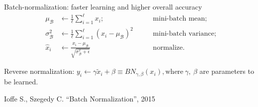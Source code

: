 \documentclass[xcolor=table]{beamer}
\begin{document}
\begin{frame}{Batch-normalization: faster learning and higher overall accuracy}
	\vspace{-0.7cm}
	\begin{align*}
		\mu_{\mathcal{B}} &\leftarrow \frac{1}{\ell} \sum_{i = 1}^\ell x_i; &\qquad \text{mini-batch mean};\\
		\sigma^2_{\mathcal{B}} &\leftarrow \frac{1}{\ell} \sum_{i = 1}^\ell (x_i - \mu_{\mathcal{B}})^2&\qquad \text{mini-batch variance};\\
		\hat{x}_i &\leftarrow \frac{x_i - \mu_{\mathcal{B}}}{\sqrt{\sigma^2_{\mathcal{B}} + \epsilon}} &\qquad \text{normalize}.
	\end{align*}

	\vspace{-0.1cm}
	Reverse normalization: $y_i \leftarrow \gamma \tilde{x}_i + \beta \equiv BN_{\gamma, \beta}(x_i), \text{where} \ \gamma,\ \beta$ are parameters to be learned. 



 	\vspace{-0.1cm}
	{\footnotesize Ioffe S., Szegedy C. ``Batch Normalization'', 2015}
\end{frame}
\end{document}
